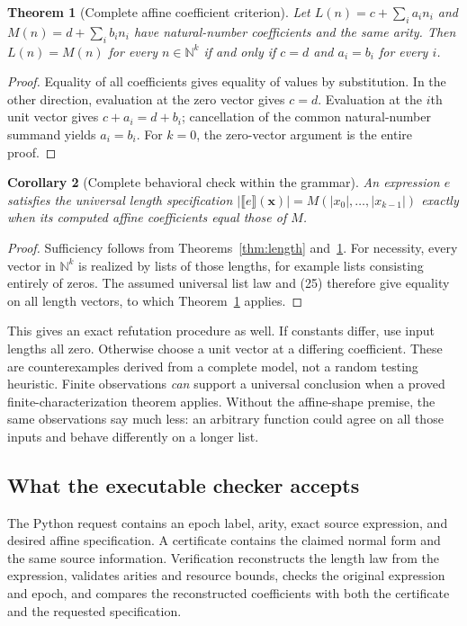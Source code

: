 \documentclass[11pt,letterpaper]{article}
\newcommand{\N}{\mathbb N}
\newcommand{\den}[1]{\llbracket #1\rrbracket}
\newtheorem{theorem}{Theorem}[section]
\newtheorem{corollary}[theorem]{Corollary}
\theoremstyle{definition}
\theoremstyle{remark}
\begin{document}
\begin{theorem}[Complete affine coefficient criterion]\label{thm:affine}
Let $L(n)=c+\sum_i a_i n_i$ and $M(n)=d+\sum_i b_i n_i$ have natural-number
coefficients and the same arity. Then $L(n)=M(n)$ for every $n\in\N^k$ if and
only if $c=d$ and $a_i=b_i$ for every $i$.
\end{theorem}
\begin{proof}
Equality of all coefficients gives equality of values by substitution. In the
other direction, evaluation at the zero vector gives $c=d$. Evaluation at the
$i$th unit vector gives $c+a_i=d+b_i$; cancellation of the common natural-number
summand yields $a_i=b_i$. For $k=0$, the zero-vector argument is the entire
proof.
\end{proof}

\begin{corollary}[Complete behavioral check within the grammar]
An expression $e$ satisfies the universal length specification
$|\den e(\mathbf x)|=M(|x_0|,\ldots,|x_{k-1}|)$ exactly when its computed affine
coefficients equal those of $M$.
\end{corollary}
\begin{proof}
Sufficiency follows from Theorems~\ref{thm:length} and~\ref{thm:affine}. For
necessity, every vector in $\N^k$ is realized by lists of those lengths, for
example lists consisting entirely of zeros. The assumed universal list law and
(25) therefore give equality on all length vectors, to which
Theorem~\ref{thm:affine} applies.
\end{proof}

This gives an exact refutation procedure as well. If constants differ, use input
lengths all zero. Otherwise choose a unit vector at a differing coefficient.
These are counterexamples derived from a complete model, not a random testing
heuristic. Finite observations \emph{can} support a universal conclusion when a
proved finite-characterization theorem applies. Without the affine-shape
premise, the same observations say much less: an arbitrary function could agree
on all those inputs and behave differently on a longer list.

\subsection{What the executable checker accepts}
The Python request contains an epoch label, arity, exact source expression, and
desired affine specification. A certificate contains the claimed normal form
and the same source information. Verification reconstructs the length law from
the expression, validates arities and resource bounds, checks the original
expression and epoch, and compares the reconstructed coefficients with both the
certificate and the requested specification.
\end{document}
